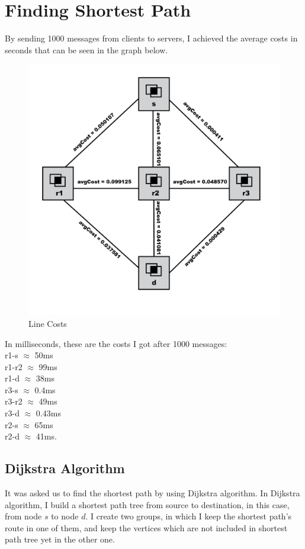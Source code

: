 \documentclass[conference]{IEEEtran}
\begin{document}
\section{Finding Shortest Path}
By sending 1000 messages from clients to servers, I achieved the average costs in seconds that can be seen in the graph below.

\begin{figure}[h!]
  \includegraphics[width=\linewidth]{shortestPath-01.png}
  \centering
  \caption{Line Costs}
  \label{fig:Topology}
\end{figure}

In milliseconds, these are the costs I got after 1000 messages: \\ r1-s $\approx$ 50ms\\ r1-r2 $\approx$ 99ms\\ r1-d $\approx$ 38ms\\ r3-s $\approx$ 0.4ms\\ r3-r2 $\approx$ 49ms\\ r3-d $\approx$ 0.43ms\\ r2-s $\approx$ 65ms\\ r2-d $\approx$ 41ms.

\subsection{Dijkstra Algorithm}
It was asked us to find the shortest path by using Dijkstra algorithm. In Dijkstra algorithm, I build a shortest path tree from source to destination, in this case, from node $s$ to node $d$. I create two groups, in which I keep the shortest path's route in one of them, and keep the vertices which are not included in shortest path tree yet in the other one.
\end{document}
